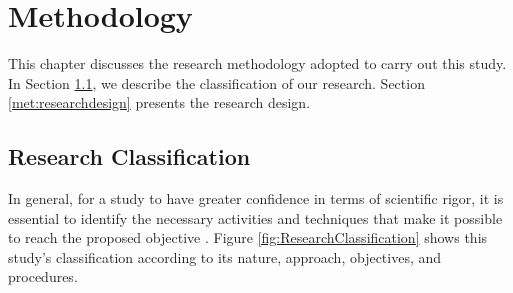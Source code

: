 \chapter{Methodology}\label{chap:methodology}

This chapter discusses the research methodology adopted to carry out this study.
In Section \ref{met:researchClassification}, we describe the classification of our research.
Section \ref{met:researchdesign} presents the research design.

\section{Research Classification}\label{met:researchClassification}

In general, for a study to have greater confidence in terms of scientific rigor, it is essential to identify the necessary activities and techniques that make it possible to reach the proposed objective \cite{Peffers:2007, Vinayak:2019}.
Figure \ref{fig:ResearchClassification} shows this study's classification according to its nature, approach, objectives, and procedures.

